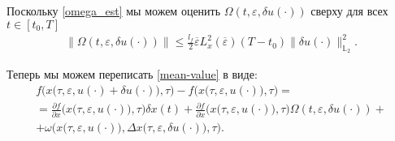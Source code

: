 \documentclass[../main.tex]{subfiles}
\begin{document}
Поскольку \eqref{omega_est} мы можем оценить $\Omega(t,\varepsilon, \delta u(\cdot)) $ сверху для всех $t \in [t_0, T]$
\begin{gather}
 \| \Omega(t,\varepsilon, \delta u(\cdot))\| \leqslant \frac{l_f}{2} \overline{\varepsilon} L_x^2(\overline{\varepsilon})(T-t_0)\|\delta u(\cdot)\|_{\mathbb{L}_2}^2.
\end{gather}

Теперь мы можем переписать \eqref{mean-value} в виде:
\begin{gather*}
 f\Big(x\big(\tau,\varepsilon, u(\cdot) + \delta u(\cdot)\big),\tau\Big) -
 f\Big(x\big(\tau,\varepsilon, u(\cdot)\big),\tau\Big) = \\ =
 \frac{\partial f}{\partial x} \Big(x\big(\tau,\varepsilon, u(\cdot)\big), \tau\Big) \delta x(t) + 
 \frac{\partial f}{\partial x} \Big(x\big(\tau,\varepsilon, u(\cdot)\big), \tau\Big) \Omega(t,\varepsilon, \delta u(\cdot))
 + \\ + 
 \omega\Big(x\big(\tau,\varepsilon, u(\cdot)\big),\Delta x\big(\tau, \varepsilon, \delta u(\cdot)\big),\tau\Big).
\end{gather*}
\end{document}
